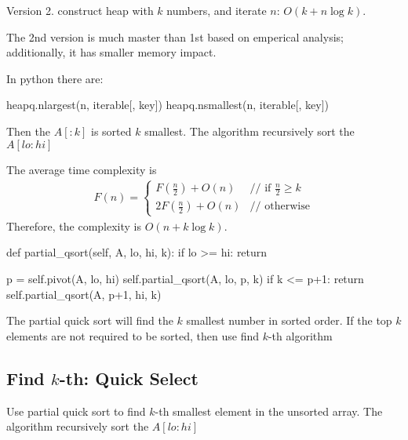 Version 2. construct heap with $k$ numbers, and iterate $n$: $O(k+n\log k)$. 

The 2nd version is much master than 1st based on emperical analysis; additionally, it has smaller memory impact. 

In python there are:
\begin{python}
heapq.nlargest(n, iterable[, key])
heapq.nsmallest(n, iterable[, key])
\end{python}


  Then the $A[:k]$ is sorted $k$ smallest. The algorithm recursively sort the $A[lo:hi]$

The average time complexity is
\begin{eqnarray*}
F(n) = \left\{ \begin{array}{rl}
  F(\frac{n}{2})+O(n) &\mbox{// if $\frac{n}{2} \geq k$} \\
  2F(\frac{n}{2})+O(n) &\mbox{// otherwise}
       \end{array} \right.
\end{eqnarray*}
Therefore, the complexity is $O(n+k \log k)$.
\begin{python}
def partial_qsort(self, A, lo, hi, k):
    if lo >= hi:
      return

    p = self.pivot(A, lo, hi)
    self.partial_qsort(A, lo, p, k)
    if k <= p+1:
      return
    self.partial_qsort(A, p+1, hi, k)
\end{python}
The partial quick sort will find the $k$ smallest number in sorted order. If the top $k$ elements are not required to be sorted, then use find $k$-th algorithm 

\subsection{Find $k$-th: Quick Select}
Use partial quick sort to find $k$-th smallest element in the unsorted array. The algorithm recursively sort the $A[lo:hi]$

